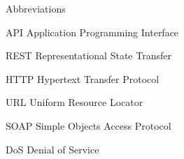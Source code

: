 
\begin{dictionary}{Abbreviations}
\item[API]	Application Programming Interface
\item[REST]	Representational State Transfer
\item[HTTP]	Hypertext Transfer Protocol
\item[URL] Uniform Resource Locator
\item[SOAP] Simple Objects 
Access Protocol
\item[DoS] Denial of Service
\end{dictionary}
